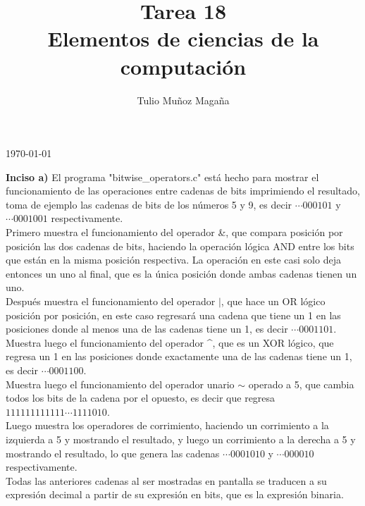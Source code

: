 \documentclass[12pt]{article}
\begin{document}
\title{Tarea 18\\
	\large Elementos de ciencias de la computación}

\author{Tulio Muñoz Magaña}
\today
\maketitle

\textbf{Inciso a)} El programa "bitwise\_operators.c" está hecho para mostrar el funcionamiento de las operaciones entre cadenas de bits imprimiendo el resultado, toma de ejemplo las cadenas de bits de los números 5 y 9, es decir $\cdots 000101$ y $\cdots 0001001$ respectivamente.\\

Primero muestra el funcionamiento del operador \&, que compara posición por posición las dos cadenas de bits, haciendo la operación lógica AND entre los bits que están en la misma posición respectiva. La operación en este casi solo deja entonces un uno al final, que es la única posición donde ambas cadenas tienen un uno.\\

Después muestra el funcionamiento del operador $|$, que hace un OR lógico posición por posición, en este caso regresará una cadena que tiene un 1 en las posiciones donde al menos una de las cadenas tiene un 1, es decir $\cdots 0001101$.\\

Muestra luego el funcionamiento del operador \textasciicircum, que es un XOR lógico, que regresa un 1 en las posiciones donde exactamente una de las cadenas tiene un 1, es decir $\cdots 0001100$.\\

Muestra luego el funcionamiento del operador unario $\sim$ operado a 5, que cambia todos los bits de la cadena por el opuesto, es decir que regresa $111111111111 \cdots 1111010$.\\

Luego muestra los operadores de corrimiento, haciendo un corrimiento a la izquierda a 5 y mostrando el resultado, y luego un corrimiento a la derecha a 5 y mostrando el resultado, lo que genera las cadenas $\cdots 0001010$ y $\cdots 000010$ respectivamente.\\

Todas las anteriores cadenas al ser mostradas en pantalla se traducen a su expresión decimal a partir de su expresión en bits, que es la expresión binaria.\\
\end{document}
